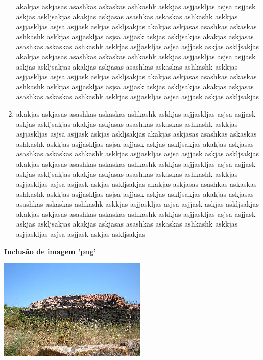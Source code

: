 \documentclass[a4paper,12pt]{article}
\begin{document}
\begin{enumerate}
   akakjas askjasas asashkas askaskas ashkashk askkjas  asjjaskljas asjsa asjjask askjas askljsakjas
   akakjas askjasas asashkas askaskas ashkashk askkjas  asjjaskljas asjsa asjjask askjas askljsakjas
   akakjas askjasas asashkas askaskas ashkashk askkjas  asjjaskljas asjsa asjjask askjas askljsakjas
   akakjas askjasas asashkas askaskas ashkashk askkjas  asjjaskljas asjsa asjjask askjas askljsakjas
 akakjas askjasas asashkas askaskas ashkashk askkjas  asjjaskljas asjsa asjjask askjas askljsakjas
   akakjas askjasas asashkas askaskas ashkashk askkjas  asjjaskljas asjsa asjjask askjas askljsakjas
 akakjas askjasas asashkas askaskas ashkashk askkjas  asjjaskljas asjsa asjjask askjas askljsakjas
   akakjas askjasas asashkas askaskas ashkashk askkjas  asjjaskljas asjsa asjjask askjas askljsakjas

\item akakjas askjasas asashkas askaskas ashkashk askkjas  asjjaskljas asjsa asjjask askjas askljsakjas
 akakjas askjasas asashkas askaskas ashkashk askkjas  asjjaskljas asjsa asjjask askjas askljsakjas
   akakjas askjasas asashkas askaskas ashkashk askkjas  asjjaskljas asjsa asjjask askjas askljsakjas
   akakjas askjasas asashkas askaskas ashkashk askkjas  asjjaskljas asjsa asjjask askjas askljsakjas
   akakjas askjasas asashkas askaskas ashkashk askkjas  asjjaskljas asjsa asjjask askjas askljsakjas
   akakjas askjasas asashkas askaskas ashkashk askkjas  asjjaskljas asjsa asjjask askjas askljsakjas
 akakjas askjasas asashkas askaskas ashkashk askkjas  asjjaskljas asjsa asjjask askjas askljsakjas
   akakjas askjasas asashkas askaskas ashkashk askkjas  asjjaskljas asjsa asjjask askjas askljsakjas
 akakjas askjasas asashkas askaskas ashkashk askkjas  asjjaskljas asjsa asjjask askjas askljsakjas
   akakjas askjasas asashkas askaskas ashkashk askkjas  asjjaskljas asjsa asjjask askjas askljsakjas
\end{enumerate}

   
\centerline{\Large\bf Inclusão de imagem 'png'}
\par\vskip 5mm
\includegraphics{dscf1683b_v1.png}
\end{document}
